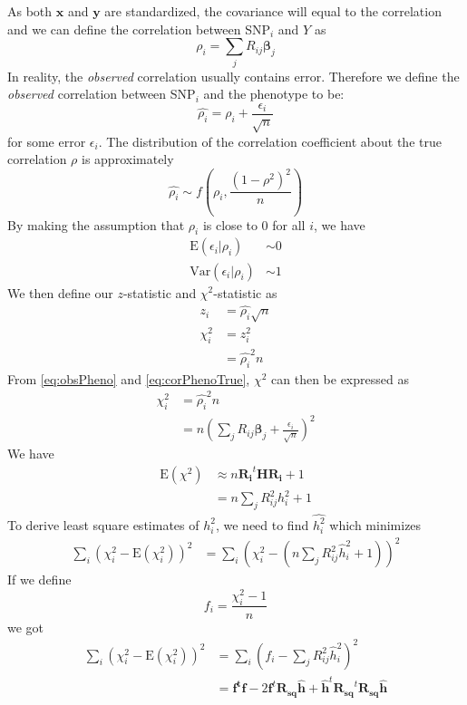 \documentclass[12pt]{scrbook}
\begin{document}
As both $\boldsymbol{x}$ and $\boldsymbol{y}$ are standardized, the covariance will equal to the correlation and we can define the correlation between \gls{SNP}$_i$ and $Y$ as
\begin{equation}
\rho_i = \sum_j{R_{ij}\boldsymbol{\beta}_j}
\label{eq:corPhenoTrue}
\end{equation}
In reality, the \emph{observed} correlation usually contains error. 
Therefore we define the \emph{observed} correlation between \gls{SNP}$_i$ and the phenotype to be:
\begin{equation}
\hat{\rho_i} = \rho_i+\frac{\epsilon_i}{\sqrt{n}}
\label{eq:obsPheno}
\end{equation}
for some error $\epsilon_i$. 
The distribution of the correlation coefficient about the true correlation $\rho$ is approximately
$$
\hat{\rho_i}\sim f(\rho_i, \frac{(1-\rho^2)^2}{n})
$$
By making the assumption that $\rho_i$ is close to 0 for all $i$, we have 
\begin{align*}
\mathrm{E}(\epsilon_i|\rho_i)&\sim 0\\
\mathrm{Var}(\epsilon_i|\rho_i)&\sim 1
\end{align*}
We then define our $z$-statistic and $\chi^2$-statistic as
\begin{align*}
z_i &= \hat{\rho_i}\sqrt{n} \\
\chi^2_i &= z_i^2\\
&=\hat{\rho_i}^2n
\end{align*}
From \cref{eq:obsPheno} and \cref{eq:corPhenoTrue}, $\chi^2$ can then be expressed as
\begin{align*}
\chi^2_i&=\hat{\rho_i}^2n\\
&=n(\sum_j{R_{ij}\boldsymbol{\beta}_j}+\frac{\epsilon_i}{\sqrt{n}})^2
\end{align*}
We have
\begin{align*}
\mathrm{E}(\chi^2) &\approx n\boldsymbol{R_i}^t\boldsymbol{HR_i}+1 \nonumber\\
&=n\sum_j{R^2_{ij}h_i^2}+1
\end{align*}
To derive least square estimates of $h_i^2$, we need to find $\hat{h_i^2}$ which minimizes
\begin{align*}
\sum_i(\chi_i^2-\mathrm{E}(\chi_i^2))^2&=\sum_i(\chi_i^2-(n\sum_j{R^2_{ij}\hat{h}_i^2}+1))^2
\end{align*}
If we define 
\begin{equation}
f_i= \frac{\chi_i^2-1}{n}
\label{eq:defineF}
\end{equation}
we got
\begin{align}
\sum_i(\chi_i^2-\mathrm{E}(\chi_i^2))^2&=\sum_i(f_i-\sum_j{R^2_{ij}\hat{h}_i^2})^2 \nonumber\\
&=\boldsymbol{f^tf}-2\boldsymbol{f}^t\boldsymbol{R_{sq}\hat{h}}+\boldsymbol{\hat{h}}^t\boldsymbol{R_{sq}}^t\boldsymbol{R_{sq}\hat{h}}
\label{eq:leastSquareH}
\end{align}
\end{document}
